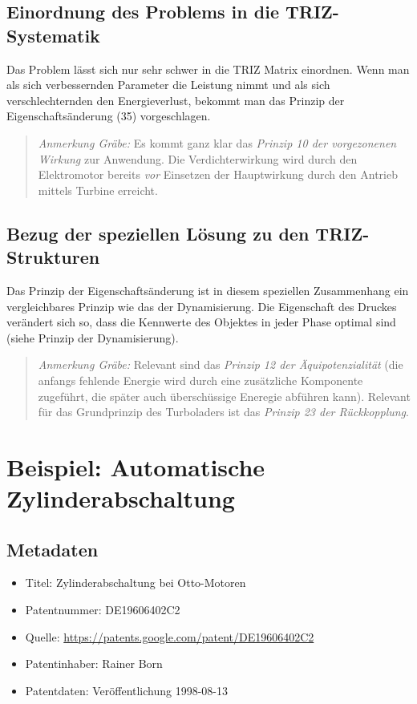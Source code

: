 \documentclass[11pt,a4paper]{article}
\newcommand{\HGG}[1]{\begin{quote} \emph{Anmerkung Gräbe:} #1  \end{quote}}
\begin{document}
\subsection{Einordnung des Problems in die TRIZ-Systematik}
Das Problem lässt sich nur sehr schwer in die TRIZ Matrix einordnen. Wenn man
als sich verbessernden Parameter die Leistung nimmt und als sich
verschlechternden den Energieverlust, bekommt man das Prinzip der
Eigenschaftsänderung (35) vorgeschlagen.

\HGG{Es kommt ganz klar das \emph{Prinzip 10 der vorgezonenen Wirkung} zur
  Anwendung.  Die Verdichterwirkung wird durch den Elektromotor bereits
  \emph{vor} Einsetzen der Hauptwirkung durch den Antrieb mittels Turbine
  erreicht.} 

\subsection{Bezug der speziellen Lösung zu den TRIZ-Strukturen}

Das Prinzip der Eigenschaftsänderung ist in diesem speziellen Zusammenhang ein
vergleichbares Prinzip wie das der Dynamisierung. Die Eigenschaft des Druckes
verändert sich so, dass die Kennwerte des Objektes in jeder Phase optimal
sind (siehe Prinzip der Dynamisierung).

\HGG{Relevant sind das \emph{Prinzip 12 der Äquipotenzialität} (die anfangs
  fehlende Energie wird durch eine zusätzliche Komponente zugeführt, die
  später auch überschüssige Eneregie abführen kann).  Relevant für das
  Grundprinzip des Turboladers ist das \emph{Prinzip 23 der Rückkopplung}.}

\section{Beispiel: Automatische Zylinderabschaltung}
\subsection{Metadaten}
\begin{itemize}\itemsep0pt
\item Titel: Zylinderabschaltung bei Otto-Motoren
\item Patentnummer: DE19606402C2
\item Quelle: \url{https://patents.google.com/patent/DE19606402C2}
\item Patentinhaber:  Rainer Born 
\item Patentdaten: Veröffentlichung 1998-08-13
\end{itemize}
\end{document}
